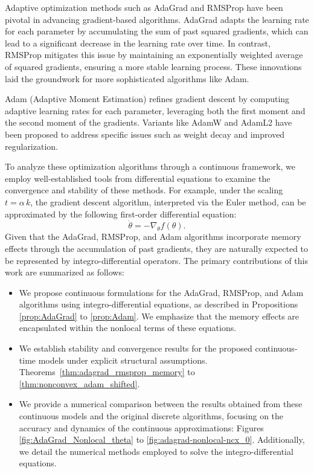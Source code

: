 \documentclass{article} %
\begin{document}
Adaptive optimization methods such as AdaGrad \cite{AdaGra} and RMSProp \cite{hinton_lecture6} have been pivotal in advancing gradient-based algorithms. AdaGrad adapts the learning rate for each parameter by accumulating the sum of past squared gradients, which can lead to a significant decrease in the learning rate over time. In contrast, RMSProp mitigates this issue by maintaining an exponentially weighted average of squared gradients, ensuring a more stable learning process. These innovations laid the groundwork for more sophisticated algorithms like Adam.

Adam (Adaptive Moment Estimation) \cite{kingma2014} refines gradient descent by computing adaptive learning rates for each parameter, leveraging both the first moment and the second moment of the gradients. Variants like AdamW \cite{loshchilov2017} and AdamL2 have been proposed to address specific issues such as weight decay and improved regularization.

To analyze these optimization algorithms through a continuous framework, we employ well-established tools from differential equations to examine the convergence and stability of these methods. For example, under the scaling \( t = \alpha\,k \), the gradient descent algorithm, interpreted via the Euler method, can be approximated by the following first-order differential equation:
\[
\dot{\theta} = -\nabla_\theta f(\theta).
\]
Given that the AdaGrad, RMSProp, and Adam algorithms incorporate memory effects through the accumulation of past gradients, they are naturally expected to be represented by integro-differential operators. The primary contributions of this work are summarized as follows:
\begin{itemize}
    \item We propose continuous formulations for the AdaGrad, RMSProp, and Adam algorithms using integro-differential equations, as described in Propositions \ref{prop:AdaGrad} to \ref{prop:Adam}. We emphasize that the memory effects are encapsulated within the nonlocal terms of these equations.
    
    \item We establish stability and convergence results for the proposed continuous-time models under explicit structural assumptions. Theorems~\ref{thm:adagrad_rmsprop_memory} to \ref{thm:nonconvex_adam_shifted}.
    
    \item We provide a numerical comparison between the results obtained from these continuous models and the original discrete algorithms, focusing on the accuracy and dynamics of the continuous approximations: Figures \ref{fig:AdaGrad_Nonlocal_theta} to \ref{fig:adagrad-nonlocal-ncx_0}. Additionally, we detail the numerical methods employed to solve the integro-differential equations.
\end{itemize}
\end{document}
